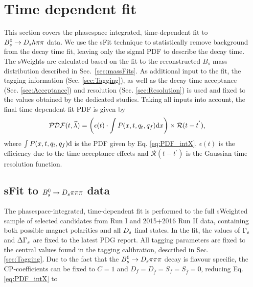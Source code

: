 \section{Time dependent fit}
\label{sec:Tfit}

This section covers the phasespace integrated, time-dependent fit to ${{B}^0_{s}}\rightarrow{\ensuremath{{D}_{s}}}{\ensuremath{h}}{\ensuremath{\pi}}{\ensuremath{\pi}}$ data.
We use the \textsf{sFit} technique \cite{Pivk:2004ty}  to statistically remove background from the decay time fit, leaving only the signal PDF to describe the decay time. 
The \textsf{sWeights} are calculated based on the fit to the reconstructed $B_s$ mass distribution described in Sec.~\ref{sec:massFits}.
As additional input to the fit, the tagging information (Sec. \ref{sec:Tagging}), 
as well as the decay time acceptance (Sec. \ref{sec:Acceptance}) and resolution (Sec. \ref{sec:Resolution}) is used and fixed to the values obtained by the dedicated studies. 
Taking all inputs into account, the final time dependent fit PDF is given by
\begin{equation}
\label{eq:TPDF_full}
\mathcal{PDF}(t,\vec{\lambda}) = \left(\epsilon(t)\cdot \int P(x,t,q_t,q_f) \text d x \right) \times \mathcal{R}(t - t^{'}),
\end{equation}
where $\int P(x,t,q_t,q_f) \text d$ is the PDF given by Eq. \ref{eq:PDF_intX}, $\epsilon(t)$ is the efficiency due to the time acceptance effects and $\mathcal{R}(t - t^{'})$ is the Gaussian time resolution function. 



\subsection{sFit to ${{B}^0_{s}}\rightarrow{\ensuremath{{D}_{s}}}{\ensuremath{\pi}}{\ensuremath{\pi}}{\ensuremath{\pi}}$ data}  
The phasespace-integrated, time-dependent fit is performed to the full sWeighted sample of selected candidates from Run I and 2015+2016 Run II data, containing both possible magnet polarities and all ${{D}_{s}}$ final states.
In the fit, the values of ${\Gamma_{{s}}}$ and ${\Delta\Gamma_{{s}}}$ are fixed to the latest PDG report. All tagging parameters are fixed to the central values found in the tagging calibration, described in Sec. \ref{sec:Tagging}.
Due to the fact that the ${{B}^0_{s}}\rightarrow{\ensuremath{{D}_{s}}}{\ensuremath{\pi}}{\ensuremath{\pi}}{\ensuremath{\pi}}$ decay is flavour specific, the CP-coefficients can be fixed to $C=1$ and $D_{f} = D_{\bar{f}} = S_{f} = S_{\bar{f}} = 0$, reducing Eq. \ref{eq:PDF_intX} to

